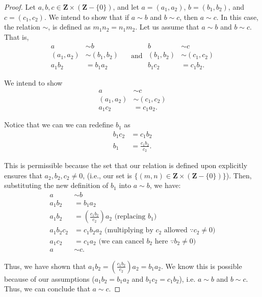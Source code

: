 \documentclass[12pt,oneside]{amsart}
\theoremstyle{remark}
\newcommand{\bfZ}{\mathbf{Z}}
\begin{document}
\begin{proof}
Let $a, b, c \in \bfZ \times (\bfZ - \{0\})$, and let $a = (a_1, a_2)$, $b = (b_1, b_2)$, and $c = (c_1, c_2)$. We intend to show that if $a \sim b$ and $b \sim c$, then $a \sim c$. In this case, the relation $\sim$, is defined as $m_1n_2 = n_1m_2$. Let us assume that $a \sim b$ and $b \sim c$. That is,
\begin{equation}
\begin{split}
         a &\sim b \\
(a_1, a_2) &\sim (b_1, b_2) \\
    a_1b_2 &= b_1a_2
\end{split}
\quad\text{ and }
\begin{split}
         b &\sim c \\
(b_1, b_2) &\sim (c_1, c_2) \\
    b_1c_2 &= c_1b_2.
\end{split}
\end{equation}

We intend to show
\begin{equation}
\begin{split}
         a &\sim c \\
(a_1, a_2) &\sim (c_1, c_2) \\
    a_1c_2 &= c_1a_2.
\end{split}
\end{equation}

Notice that we can we can redefine $b_1$ as
\begin{equation}
\begin{split}
b_1c_2 &= c_1b_2 \\
b_1 &= \frac{c_1b_2}{c_2}.
\end{split}
\end{equation}

This is permissible because the set that our relation is defined upon explicitly ensures that $a_2, b_2, c_2 \neq 0$, (i.e., our set is $\{(m, n) \in \bfZ \times (\bfZ - \{0\})\}$). Then, substituting the new definition of $b_1$ into $a \sim b$, we have:
\begin{equation}
\begin{split}
a &\sim b \\
a_1b_2 &= b_1a_2 \\
a_1b_2 &= (\frac{c_1b_2}{c_2})a_2 \text{ (replacing $b_1$)} \\
a_1b_2c_2 &= c_1b_2a_2 \text{ (multiplying by $c_2$ allowed $\because c_2 \neq 0$)} \\
a_1c_2 &= c_1a_2 \text{ (we can cancel $b_2$ here $\because b_2 \neq 0$)} \\
a &\sim c.
\end{split}
\end{equation}

Thus, we have shown that $a_1b_2 = (\frac{c_1b_2}{c_2})a_2 = b_1a_2$. We know this is possible because of our assumptions ($a_1b_2 = b_1a_2$ and $b_1c_2 = c_1b_2$), i.e. $a \sim b$ and $b \sim c$. Thus, we can conclude that $a \sim c$.
\end{proof}
\end{document}
